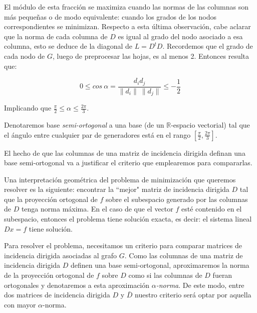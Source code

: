 \documentclass[conference,compsoc,a4paper]{IEEEtran}
\begin{document}
El módulo de esta fracción se maximiza cuando las normas de las 
columnas son más pequeñas o de modo equivalente: cuando los grados de 
los nodos correspondientes se minimizan. Respecto a esta última 
observación, cabe aclarar que la norma de cada columna de $D$ es igual 
al grado del nodo asociado a esa columna, esto se deduce de la diagonal 
de $L = D^t D$. Recordemos que el grado de cada nodo de  $G$, luego de 
preprocesar las hojas, es al menos 2. Entonces resulta que:

$$0\le cos \ \alpha = \frac{d_i d_j}{\|d_i\| \ \|d_j\|} \le -\frac{1}{2}$$

\smallskip

Implicando que $\frac{\pi}{2}\le\alpha \leq \frac{2\pi}{3}$.

\smallskip

Denotaremos base \textit{semi-ortogonal} a una base (de un 
$\mathbb{R}$-espacio vectorial) tal que el ángulo entre cualquier par de 
generadores está en el rango $[\frac{\pi}{2},\frac{2\pi}{3}]$.

\smallskip

El hecho de que las columnas de una matriz de incidencia dirigida 
definan una base semi-ortogonal va a justificar el criterio que 
emplearemos para compararlas.

\bigskip


Una interpretación geométrica del problema de minimización que queremos 
resolver es la siguiente: encontrar la ``mejor" matriz de incidencia 
dirigida $D$ tal que la proyección ortogonal de $f$ sobre el subespacio 
generado por las columnas de $D$ tenga norma máxima. En el caso de que 
el vector $f$ esté contenido en el subespacio, entonces el problema 
tiene solución exacta, es decir: el sistema lineal $Dx = f$ tiene 
solución.

\smallskip

Para resolver el problema, necesitamos un criterio para comparar  
matrices de incidencia dirigida asociadas al grafo $G$. Como las 
columnas de una matriz de incidencia dirigida $D$ definen una base 
semi-ortogonal, aproximaremos la norma de la proyección 
ortogonal de $f$ sobre $D$ como si las columnas de $D$ fueran 
ortogonales y denotaremos a esta aproximación \textit{$\alpha$-norma}.
 De este modo, entre dos matrices de incidencia dirigida $D$ y 
 $\bar{D}$ nuestro criterio será optar por aquella con mayor 
 $\alpha$-norma. 
\end{document}
